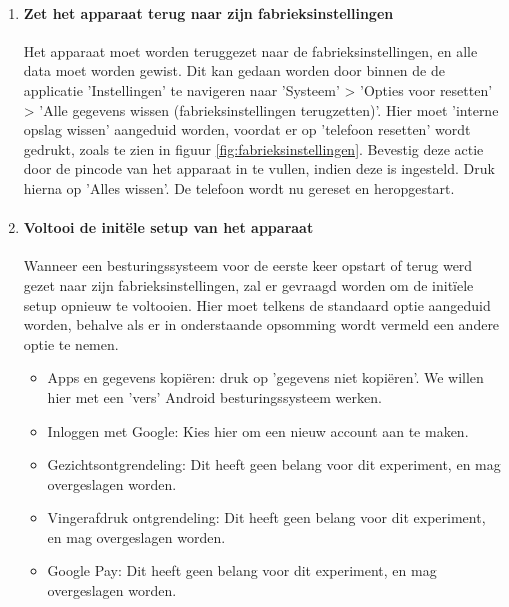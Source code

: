 \begin{enumerate}
    
    \item
    \paragraph{Zet het apparaat terug naar zijn fabrieksinstellingen}
    \label{itm:factoryreset}
    
    Het apparaat moet worden teruggezet naar de fabrieksinstellingen, en alle data moet worden gewist. Dit kan gedaan worden door binnen de de applicatie 'Instellingen' te navigeren naar 'Systeem' > 'Opties voor resetten' > 'Alle gegevens wissen (fabrieksinstellingen terugzetten)'. Hier moet 'interne opslag wissen' aangeduid worden, voordat er op 'telefoon resetten' wordt gedrukt, zoals te zien in figuur \ref{fig:fabrieksinstellingen}. Bevestig deze actie door de pincode van het apparaat in te vullen, indien deze is ingesteld. Druk hierna op 'Alles wissen'. De telefoon wordt nu gereset en heropgestart.
    
    \item
    \paragraph{Voltooi de initële setup van het apparaat}
    \label{itm:initialsetup}
    
    Wanneer een besturingssysteem voor de eerste keer opstart of terug werd gezet naar zijn fabrieksinstellingen, zal er gevraagd worden om de initïele setup opnieuw te voltooien. Hier moet telkens de standaard optie aangeduid worden, behalve als er in onderstaande opsomming wordt vermeld een andere optie te nemen.
    \begin{itemize}
        \item Apps en gegevens kopiëren: druk op 'gegevens niet kopiëren'. We willen hier met een 'vers' Android besturingssysteem werken.
        \item Inloggen met Google: Kies hier om een nieuw account aan te maken.
        \item Gezichtsontgrendeling: Dit heeft geen belang voor dit experiment, en mag overgeslagen worden.
        \item Vingerafdruk ontgrendeling: Dit heeft geen belang voor dit experiment, en mag overgeslagen worden.
        \item Google Pay: Dit heeft geen belang voor dit experiment, en mag overgeslagen worden.
    \end{itemize}


\end{enumerate}
